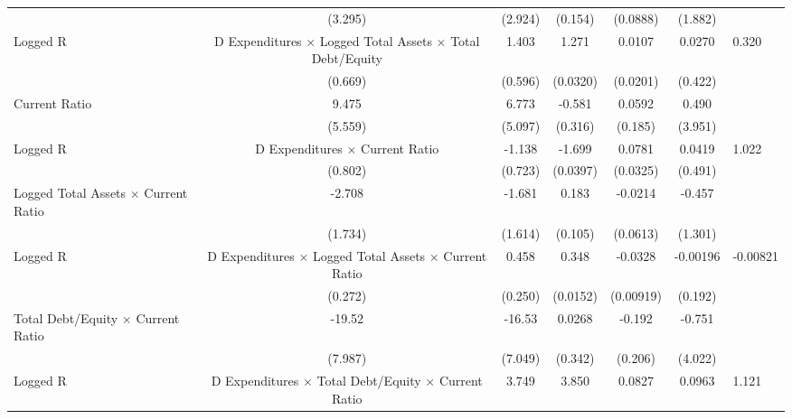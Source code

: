 \begin{table}[htbp]
\begin{tabular}{l*{5}{c}}
                    &     (3.295)         &     (2.924)         &     (0.154)         &    (0.0888)         &     (1.882)         \\
[1em]
Logged R&D Expenditures $\times$ Logged Total Assets $\times$ Total Debt/Equity&       1.403\sym{**} &       1.271\sym{**} &      0.0107         &      0.0270         &       0.320         \\
                    &     (0.669)         &     (0.596)         &    (0.0320)         &    (0.0201)         &     (0.422)         \\
[1em]
Current Ratio       &       9.475\sym{*}  &       6.773         &      -0.581\sym{*}  &      0.0592         &       0.490         \\
                    &     (5.559)         &     (5.097)         &     (0.316)         &     (0.185)         &     (3.951)         \\
[1em]
Logged R&D Expenditures $\times$ Current Ratio&      -1.138         &      -1.699\sym{**} &      0.0781\sym{*}  &      0.0419         &       1.022\sym{**} \\
                    &     (0.802)         &     (0.723)         &    (0.0397)         &    (0.0325)         &     (0.491)         \\
[1em]
Logged Total Assets $\times$ Current Ratio&      -2.708         &      -1.681         &       0.183\sym{*}  &     -0.0214         &      -0.457         \\
                    &     (1.734)         &     (1.614)         &     (0.105)         &    (0.0613)         &     (1.301)         \\
[1em]
Logged R&D Expenditures $\times$ Logged Total Assets $\times$ Current Ratio&       0.458\sym{*}  &       0.348         &     -0.0328\sym{**} &    -0.00196         &    -0.00821         \\
                    &     (0.272)         &     (0.250)         &    (0.0152)         &   (0.00919)         &     (0.192)         \\
[1em]
Total Debt/Equity $\times$ Current Ratio&      -19.52\sym{**} &      -16.53\sym{**} &      0.0268         &      -0.192         &      -0.751         \\
                    &     (7.987)         &     (7.049)         &     (0.342)         &     (0.206)         &     (4.022)         \\
[1em]
Logged R&D Expenditures $\times$ Total Debt/Equity $\times$ Current Ratio&       3.749\sym{**} &       3.850\sym{**} &      0.0827         &      0.0963\sym{*}  &       1.121         \\

\end{tabular}
\end{table}

